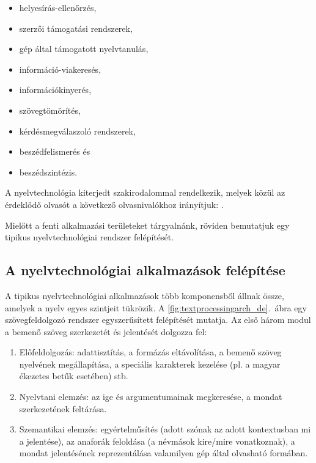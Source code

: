 \begin{multicols}{2}
\begin{itemize}
      \item helyesírás-ellenőrzés,
      \item szerzői támogatási rendszerek,
      \item gép által támogatott nyelvtanulás,
      \item információ-viakeresés, 
      \item információkinyerés,
      \item szövegtömörítés,
      \item kérdésmegválaszoló rendszerek,
      \item beszédfelismerés és
      \item beszédszintézis.
    \end{itemize}

A nyelvtechnológia kiterjedt szakirodalommal rendelkezik, melyek közül az érdeklődő olvasót a következő olvasnivalókhoz irányítjuk: \cite{jurafsky-martin01, manning-schuetze1, lt-world1, lt-survey1}.

Mielőtt a fenti alkalmazási területeket tárgyalnánk, röviden bemutatjuk egy tipikus nyelvtechnológiai rendszer felépítését. 

\subsection{A nyelvtechnológiai alkalmazások felépítése}

A tipikus nyelvtechnológiai alkalmazások több komponensből állnak össze, amelyek a nyelv egyes szintjeit tükrözik. A \ref{fig:textprocessingarch_de}.~ábra egy szövegfeldolgozó rendszer egyszerűsített felépítését mutatja. Az első három modul a bemenő szöveg szerkezetét és jelentését dolgozza fel:

\begin{enumerate}
      \item Előfeldolgozás: adattisztítás, a formázás eltávolítása, a bemenő szöveg nyelvének megállapítása, a speciális karakterek kezelése (pl. a magyar ékezetes betűk esetében) stb.
      \item Nyelvtani elemzés: az ige és argumentumainak megkeresése, a mondat szerkezetének feltárása.
      \item Szemantikai elemzés: egy\-ér\-tel\-mű\-sí\-tés (adott szónak az adott kontextusban mi a jelentése), az anaforák feloldása (a névmások kire/mire vonatkoznak), a mondat jelentésének reprezentálása valamilyen gép által olvasható formában. 
    \end{enumerate}


\end{multicols}
